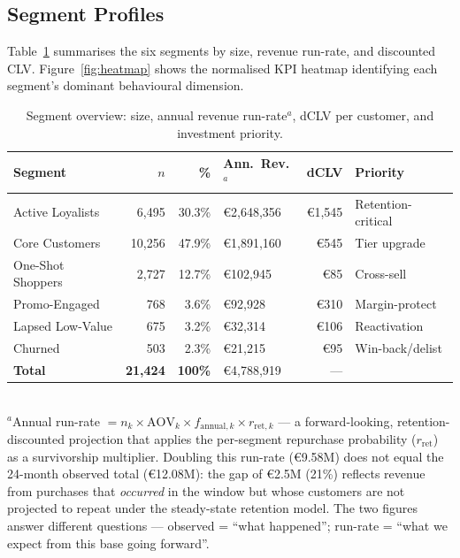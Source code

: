 \documentclass[10pt,a4paper]{article}
\newcommand{\eur}{€}
\begin{document}
\subsection{Segment Profiles}

Table~\ref{tab:segments} summarises the six segments by size, revenue run-rate, and
discounted CLV. Figure~\ref{fig:heatmap} shows the normalised KPI heatmap identifying
each segment's dominant behavioural dimension.

\begin{table}[H]
\centering\small
\caption{Segment overview: size, annual revenue run-rate$^{a}$, dCLV per customer,
  and investment priority.}
\label{tab:segments}
\begin{tabular}{@{}p{3.2cm}rrp{2.6cm}rp{2.4cm}@{}}
\toprule
\textbf{Segment} & \textbf{$n$} & \textbf{\%} & \textbf{Ann.\ Rev.$^{a}$}
  & \textbf{dCLV} & \textbf{Priority} \\
\midrule
Active Loyalists  & 6,495  & 30.3\% & \eur2,648,356 & \eur1,545 & Retention-critical \\
Core Customers    & 10,256 & 47.9\% & \eur1,891,160 & \eur545   & Tier upgrade       \\
One-Shot Shoppers & 2,727  & 12.7\% & \eur102,945   & \eur85    & Cross-sell         \\
Promo-Engaged     & 768    &  3.6\% & \eur92,928    & \eur310   & Margin-protect     \\
Lapsed Low-Value  & 675    &  3.2\% & \eur32,314    & \eur106   & Reactivation       \\
Churned           & 503    &  2.3\% & \eur21,215    & \eur95    & Win-back/delist    \\
\midrule
\textbf{Total}    & \textbf{21,424} & \textbf{100\%}
  & \eur4,788,919 & --- & \\
\bottomrule
\end{tabular}
\vspace{2pt}\\
{\footnotesize $^{a}$Annual run-rate $= n_k \times \mathrm{AOV}_k \times f_{\mathrm{annual},k}
\times r_{\mathrm{ret},k}$ --- a forward-looking, retention-discounted projection that
applies the per-segment repurchase probability ($r_{\mathrm{ret}}$) as a survivorship
multiplier. Doubling this run-rate (\eur9.58M) does not equal the 24-month observed
total (\eur12.08M): the gap of \eur2.5M (21\%) reflects revenue from purchases that
\emph{occurred} in the window but whose customers are not projected to repeat under
the steady-state retention model. The two figures answer different questions ---
observed = ``what happened''; run-rate = ``what we expect from this base going forward''.}
\end{table}
\end{document}

